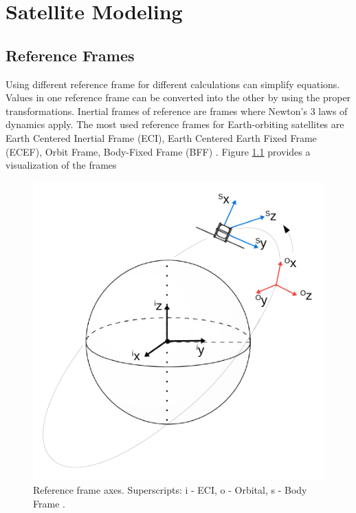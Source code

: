 \chapter{Satellite Modeling}

\section{Reference Frames}


Using different reference frame for different calculations can simplify equations. Values in one reference frame can be converted into the other by using the proper transformations.
Inertial frames of reference are frames where Newton's 3 laws of dynamics apply.
The most used reference frames for Earth-orbiting satellites are Earth Centered Inertial Frame (ECI), Earth Centered Earth Fixed Frame (ECEF), Orbit Frame, Body-Fixed Frame (BFF)  \cite{ref1} \cite{ref2}. Figure \ref{fig:frames} provides a visualization of the frames

\begin{figure}[h!]
	\centering 
	\includegraphics[width=140mm]{figures/frame.pdf}	
	\caption{Reference frame axes. Superscripts: i - ECI, o - Orbital, s - Body Frame \cite{our_report}.}
	\label{fig:frames}
\end{figure}

